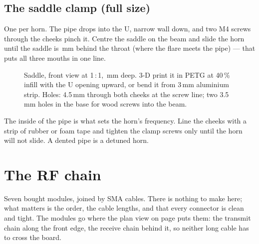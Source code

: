 \documentclass[10pt]{article}
\begin{document}
\newpage
\subsection{The saddle clamp (full size)}\label{sec:saddle}
One per horn. The pipe drops into the U, narrow wall down, and two M4 screws through the cheeks pinch it. Centre the saddle on the beam and slide the horn until the saddle is \saddleBehind\,mm behind the throat (where the flare meets the pipe) — that puts all three mouths in one line.

\begin{figure}[H]
\centering

\caption{Saddle, front view at 1\,:\,1, \saddleD\,mm deep. 3-D print it in PETG at 40\,\% infill with the U opening upward, or bend it from 3\,mm aluminium strip. Holes: 4.5\,mm through both cheeks at the screw line; two 3.5\,mm holes in the base for wood screws into the beam.}
\end{figure}

\begin{warn}
The inside of the pipe is what sets the horn's frequency. Line the cheeks with a strip of rubber or foam tape and tighten the clamp screws only until the horn will not slide. A dented pipe is a detuned horn.
\end{warn}

{\centering{}\par}

\newpage
\section{The RF chain}\label{sec:rf}

Seven bought modules, joined by SMA cables. There is nothing to make here; what matters is the order, the cable lengths, and that every connector is clean and tight. The modules go where the plan view on page \pageref{sec:plan} puts them: the transmit chain along the front edge, the receive chain behind it, so neither long cable has to cross the board.
\end{document}

